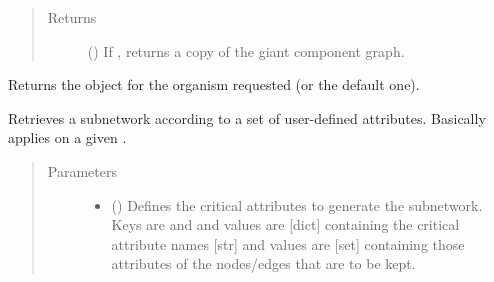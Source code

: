 \documentclass[letterpaper,10pt,english]{sphinxmanual}
\begin{document}
\begin{fulllineitems}
\begin{fulllineitems}
\begin{quote}
\begin{description}
\begin{itemize}
\end{itemize}

\item[{Returns}] \leavevmode
() \textendash{} If , returns a copy of
the giant component graph.

\end{description}\end{quote}

\end{fulllineitems}


\begin{fulllineitems}
\label{\detokenize{reference:pypath.main.PyPath.get_go}}
Returns the  object for the organism requested
(or the default one).

\end{fulllineitems}


\begin{fulllineitems}
\label{\detokenize{reference:pypath.main.PyPath.get_max}}
\end{fulllineitems}


\begin{fulllineitems}
\label{\detokenize{reference:pypath.main.PyPath.get_network}}
Retrieves a subnetwork according to a set of user-defined
attributes. Basically applies
{\hyperref[\detokenize{reference:pypath.main.PyPath.get_sub}]{}} on a given .
\begin{quote}\begin{description}
\item[{Parameters}] \leavevmode\begin{itemize}
\item {} 
 () \textendash{} Defines the critical attributes to generate the subnetwork.
Keys are  and  and values are {[}dict{]}
containing the critical attribute names {[}str{]} and values
are {[}set{]} containing those attributes of the nodes/edges
that are to be kept.


\end{itemize}
\end{description}
\end{quote}
\end{fulllineitems}
\end{fulllineitems}
\end{document}
